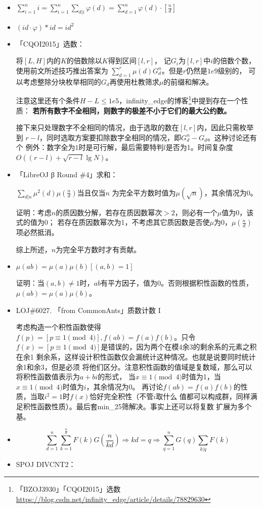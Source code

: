 \begin{itemize}
	\item $\displaystyle \sum_{i=1}^n{i}=
		      \sum_{i=1}^n{\sum_{d|i}\varphi(d)}=
		      \sum_{d=1}^n{\varphi(d)\cdot[\frac{n}{d}]}$
	\item $(id\cdot\varphi)*id=id^2$
	\item 「CQOI2015」选数：

	将$[L,H]$内的$K$的倍数除以$K$得到区间$[l,r]$，
	记$G_i$为$[l,r]$中$i$的倍数个数，使用前文所述技巧推出答案为
	$\displaystyle \sum_{d=1}^r{\mu(d)G_d^n}$。但是$r$仍然是$1e9$级别的，
	可以考虑整除分块枚举相同的$G_d$再使用杜教筛求$\mu$的前缀和解决。

	注意这里还有个条件$H-L\leq 1e5$，infinity\_edge的博客\footnote{
		「BZOJ3930」「CQOI2015」选数\\
		\url{https://blog.csdn.net/infinity\_edge/article/details/78829630}
	}中提到存在一个性质：
	{\bfseries 若所有数字不全相同，则数字的极差不小于它们的最大公约数。}

	接下来只处理数字不全相同的情况，由于选取的数在$[l,r]$内，因此只需枚举到
	$r-l$，同时选取方案要扣除数字全相同的情况，即$G_d^n-G_d$。这种讨论还有个
	例外：数字全为$1$时是可行解，最后需要特判$l$是否为1。时间复杂度
	$O((r-l)+\sqrt{r-l}\lg N)$。

	\item 「LibreOJ β Round \#4」求和：

	$\displaystyle \sum_{d|n}{\mu^2(d)\mu(\frac{n}{d})}$当且仅当$n$
	为完全平方数时值为$\mu(\sqrt{n})$，其余情况为0。

	证明：考虑$n$的质因数分解，若存在质因数幂次$>2$，则必有一个$\mu$值为0，该式的值为0；
	若存在质因数幂次为1，不考虑其它质因数是否使$\mu$为0，$\mu(\frac{n}{d})$项必然抵消。

	综上所述，$n$为完全平方数时才有贡献。
	\item $\mu(ab)=\mu(a)\mu(b)[(a,b)=1]$

	证明：当$(a,b)\neq 1$时，$ab$有平方因子，值为0。否则根据积性函数的性质，
	$\mu(ab)=\mu(a)\mu(b)$。
	\item LOJ\#6027. 「from CommonAnts」质数计数 I

	考虑构造一个积性函数使得$f(p)=[p\equiv 1\pmod{4}],f(ab)=f(a)f(b)$。只令
	$f(x)=[p\equiv 1\pmod{4}]$是错误的，因为两个在模4余3的剩余系的元素之积在余1
	剩余系，这样设计积性函数仅会漏统计这种情况。也就是说要同时统计余1和余3，但是必须
	将他们区分。注意积性函数的值域是复数域，那么可以将积性函数值表示为$a+bi$的形式，
	当$x\equiv 1\pmod{4}$时值为1，当$x\equiv 1\pmod{4}$时值为$i$，其余情况为0。
	再讨论$f(ab)=f(a)f(b)$的性质，当取$i^2=1$时$f(x)$恰好完全积性（不管$i$取什么
	值都可以构成群，同样满足积性函数性质）。最后套min\_25筛解决。事实上还可以将复数
	扩展为多个基。
	\item
	\begin{displaymath}
		\sum_{d=1}^n{\sum_{k=1}^{\frac{n}{k}}{F(k)G(\frac{n}{kd})}}\Rightarrow kd=q \Rightarrow \sum_{q=1}^n{G(q)\sum_{k|q}F(k)}
	\end{displaymath}
	\item SPOJ DIVCNT2：


\end{itemize}
